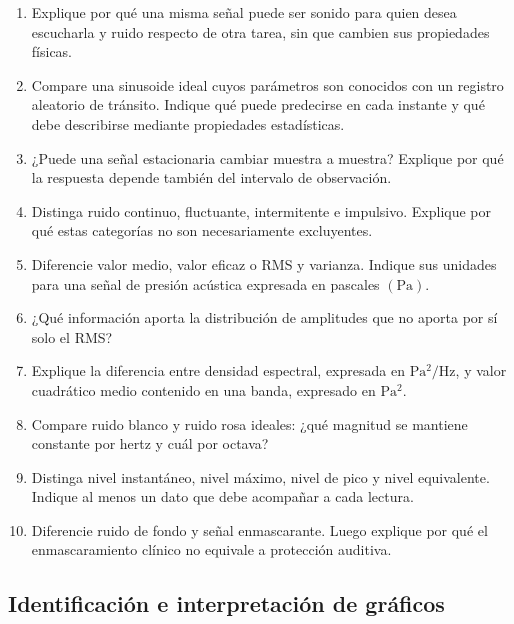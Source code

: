 \begin{enumerate}[label=\textbf{C\arabic*.},leftmargin=*]
    \item Explique por qué una misma señal puede ser sonido para quien desea
    escucharla y ruido respecto de otra tarea, sin que cambien sus propiedades
    físicas.
    \item Compare una sinusoide ideal cuyos parámetros son conocidos con un
    registro aleatorio de tránsito. Indique qué puede predecirse en cada
    instante y qué debe describirse mediante propiedades estadísticas.
    \item ¿Puede una señal estacionaria cambiar muestra a muestra? Explique
    por qué la respuesta depende también del intervalo de observación.
    \item Distinga ruido continuo, fluctuante, intermitente e impulsivo.
    Explique por qué estas categorías no son necesariamente excluyentes.
    \item Diferencie valor medio, valor eficaz o RMS y varianza. Indique sus
    unidades para una señal de presión acústica expresada en pascales
    \((\mathrm{Pa})\).
    \item ¿Qué información aporta la distribución de amplitudes que no aporta
    por sí solo el RMS?
    \item Explique la diferencia entre densidad espectral, expresada en
    \(\mathrm{Pa^2/Hz}\), y valor cuadrático medio contenido en una banda,
    expresado en \(\mathrm{Pa^2}\).
    \item Compare ruido blanco y ruido rosa ideales: ¿qué magnitud se mantiene
    constante por hertz y cuál por octava?
    \item Distinga nivel instantáneo, nivel máximo, nivel de pico y nivel
    equivalente. Indique al menos un dato que debe acompañar a cada lectura.
    \item Diferencie ruido de fondo y señal enmascarante. Luego explique por
    qué el enmascaramiento clínico no equivale a protección auditiva.
\end{enumerate}

\subsection*{Identificación e interpretación de gráficos}

